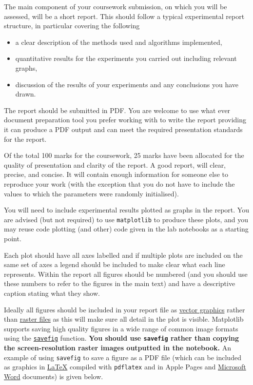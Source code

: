 \documentclass[11pt,]{article}
\begin{document}
The main component of your coursework submission, on which you will be
assessed, will be a short report. This should follow a typical
experimental report structure, in particular covering the following

\begin{itemize}
\itemsep1pt\parskip0pt
\item
  a clear description of the methods used and algorithms implemented,
\item
  quantitative results for the experiments you carried out including
  relevant graphs,
\item
  discussion of the results of your experiments and any conclusions you
  have drawn.
\end{itemize}

The report should be submitted in PDF. You are welcome to use what ever
document preparation tool you prefer working with to write the report
providing it can produce a PDF output and can meet the required
presentation standards for the report.

Of the total 100 marks for the coursework, 25 marks have been allocated
for the quality of presentation and clarity of the report. A good
report, will clear, precise, and concise. It will contain enough
information for someone else to reproduce your work (with the exception
that you do not have to include the values to which the parameters were
randomly initialised).

You will need to include experimental results plotted as graphs in the
report. You are advised (but not required) to use \texttt{matplotlib} to
produce these plots, and you may reuse code plotting (and other) code
given in the lab notebooks as a starting point.

Each plot should have all axes labelled and if multiple plots are
included on the same set of axes a legend should be included to make
clear what each line represents. Within the report all figures should be
numbered (and you should use these numbers to refer to the figures in
the main text) and have a descriptive caption stating what they show.

Ideally all figures should be included in your report file as
\href{https://en.wikipedia.org/wiki/Vector_graphics}{vector graphics}
rather than \href{https://en.wikipedia.org/wiki/Raster_graphics}{raster
files} as this will make sure all detail in the plot is visible.
Matplotlib supports saving high quality figures in a wide range of
common image formats using the
\href{http://matplotlib.org/api/pyplot_api.html\#matplotlib.pyplot.savefig}{\texttt{savefig}}
function. \textbf{You should use \texttt{savefig} rather than copying
the screen-resolution raster images outputted in the notebook.} An
example of using \texttt{savefig} to save a figure as a PDF file (which
can be included as graphics in
\href{https://en.wikibooks.org/wiki/LaTeX/Importing_Graphics}{LaTeX}
compiled with \texttt{pdflatex} and in Apple Pages and
\href{https://support.office.com/en-us/article/Add-a-PDF-to-your-Office-file-74819342-8f00-4ab4-bcbe-0f3df15ab0dc}{Microsoft
Word} documents) is given below.
\end{document}
